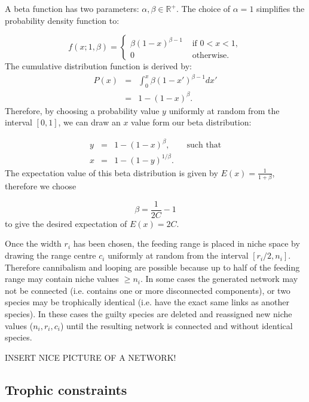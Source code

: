 A beta function has two parameters: $\alpha, \beta \in \mathbb{R^+}$. The choice of $\alpha = 1$ simplifies the probability density function to:

\begin{equation*}
f (x; 1,\beta) = \begin{cases}
\beta (1-x)^{\beta - 1} &\mbox{ if } 0 < x < 1,  \\
0	                    &\mbox{ otherwise. }
\end{cases}
\label{eq:beta_pdf}
\end{equation*}
%
The cumulative distribution function is derived by:
\begin{eqnarray*}
P(x) &=& \int_{0}^{x} \beta (1-x')^{\beta - 1} dx' \\
     &=& 1 - (1-x)^\beta . 
\label{eq:beta_cdf}                         
\end{eqnarray*}
%
Therefore, by choosing a probability value $y$ uniformly at random from the interval $[0,1]$, we can draw an $x$ value form our beta distribution:
 
\begin{eqnarray*}
y &=&  1 - (1-x)^\beta, \qquad \text{such that} \\[5pt]
x &=&  1 - (1- y)^{1/\beta}.                          
\label{eq:beta_sampling}
\end{eqnarray*}
%
The expectation value of this beta distribution is given by $E (x) = \frac{1}{1 + \beta}$, therefore we choose

\begin{equation*}
\beta = \frac{1}{2C} - 1
\label{eq:beta_value}
\end{equation*}
%
to give the desired expectation of $E(x) = 2C$.

Once the width $r_i$ has been chosen, the feeding range is placed in niche space by drawing the range centre $c_i$ uniformly at random from the interval $[r_i/2, n_i]$. Therefore cannibalism and looping are possible because up to half of the feeding range may contain niche values $\geq n_i$. In some cases the generated network may not be connected (i.e. contains one or more disconnected components), or two species may be trophically identical (i.e. have the exact same links as another species). In these cases the guilty species are deleted and reassigned new niche values ($n_i ,r_i,c_i$) until the resulting network is connected and without identical species. 

INSERT NICE PICTURE OF A NETWORK!

\subsection{Trophic constraints}
\label{sec:trophic_constraints}


